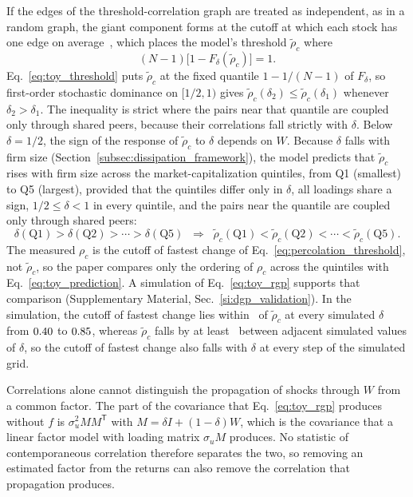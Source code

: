 \documentclass[a4paper,fleqn]{cas-sc}
\begin{document}
If the edges of the threshold-correlation graph are treated as independent, as in a random graph, the giant component forms at the cutoff at which each stock has one edge on average~\citep{stauffer1994introduction}, which places the model's threshold $\tilde\rho_c$ where
\begin{equation}\label{eq:toy_threshold}
  (N - 1)\bigl[1 - F_\delta(\tilde\rho_c)\bigr] = 1.
\end{equation}
Eq.~\eqref{eq:toy_threshold} puts $\tilde\rho_c$ at the fixed quantile $1 - 1/(N-1)$ of $F_\delta$, so first-order stochastic dominance on $[1/2,1)$ gives $\tilde\rho_c(\delta_2) \leq \tilde\rho_c(\delta_1)$ whenever $\delta_2 > \delta_1$. The inequality is strict where the pairs near that quantile are coupled only through shared peers, because their correlations fall strictly with $\delta$. Below $\delta = 1/2$, the sign of the response of $\tilde\rho_c$ to $\delta$ depends on $W$. Because $\delta$ falls with firm size (Section~\ref{subsec:dissipation_framework}), the model predicts that $\tilde\rho_c$ rises with firm size across the market-capitalization quintiles, from Q1 (smallest) to Q5 (largest), provided that the quintiles differ only in $\delta$, all loadings share a sign, $1/2 \leq \delta < 1$ in every quintile, and the pairs near the quantile are coupled only through shared peers:
\begin{equation}\label{eq:toy_prediction}
  \delta(\text{Q1}) > \delta(\text{Q2}) > \cdots > \delta(\text{Q5}) \;\;\Longrightarrow\;\; \tilde\rho_c(\text{Q1}) < \tilde\rho_c(\text{Q2}) < \cdots < \tilde\rho_c(\text{Q5}).
\end{equation}
The measured $\rho_c$ is the cutoff of fastest change of Eq.~\eqref{eq:percolation_threshold}, not $\tilde\rho_c$, so the paper compares only the ordering of $\rho_c$ across the quintiles with Eq.~\eqref{eq:toy_prediction}. A simulation of Eq.~\eqref{eq:toy_rgp} supports that comparison (Supplementary Material, Sec.~\ref{si:dgp_validation}). In the simulation, the cutoff of fastest change lies within \dgpEqEightMaxGap\ of $\tilde\rho_c$ at every simulated $\delta$ from $0.40$ to $0.85$, whereas $\tilde\rho_c$ falls by at least \dgpDegOneMinFall\ between adjacent simulated values of $\delta$, so the cutoff of fastest change also falls with $\delta$ at every step of the simulated grid.

Correlations alone cannot distinguish the propagation of shocks through $W$ from a common factor. The part of the covariance that Eq.~\eqref{eq:toy_rgp} produces without $f$ is $\sigma_u^2 M M^{\mathsf{T}}$ with $M = \delta I + (1-\delta)W$, which is the covariance that a linear factor model with loading matrix $\sigma_u M$ produces. No statistic of contemporaneous correlation therefore separates the two, so removing an estimated factor from the returns can also remove the correlation that propagation produces.
\end{document}
